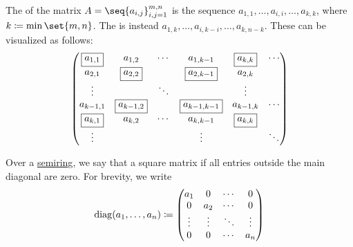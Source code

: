 \begin{definition}\label{def:matrix_diagonal}
  The  of the matrix \( A = \seq{ a_{i,j} }_{i,j=1}^{m,n} \) is the sequence \( a_{1,1}, \ldots, a_{i,i}, \ldots, a_{k,k} \), where \( k \coloneqq \min\set{ m, n } \). The  is instead \( a_{1,k}, \ldots, a_{i,k-i}, \ldots, a_{k,n-k} \). These can be visualized as follows:
  \begin{equation*}
    \begin{pmatrix}
      \fbox{\( a_{1,1} \)} & a_{1,2}                & \cdots & a_{1,k-1}                & \fbox{\( a_{k,k} \)} & \cdots \\
      a_{2,1}              & \fbox{\( a_{2,2} \)}   &        & \fbox{\( a_{2,k-1} \)}   & a_{2,k}              &        \\
      \vdots               &                        & \ddots &                          & \vdots               &        \\
      a_{k-1,1}            & \fbox{\( a_{k-1,2} \)} &        & \fbox{\( a_{k-1,k-1} \)} & a_{k-1,k}            & \cdots \\
      \fbox{\( a_{k,1} \)} & a_{k,2}                & \cdots & a_{k,k-1}                & \fbox{\( a_{k,k} \)} &        \\
      \vdots               &                        &        & \vdots                   &                      & \ddots
    \end{pmatrix}
  \end{equation*}

  Over a \hyperref[def:semiring]{semiring}, we say that a square matrix  if all entries outside the main diagonal are zero. For brevity, we write
  \begin{equation*}
    \operatorname{diag}(a_1, \ldots, a_n)
    \coloneqq
    \begin{pmatrix}
      a_1    & 0      & \cdots & 0      \\
      0      & a_2    & \cdots & 0      \\
      \vdots & \vdots & \ddots & \vdots \\
      0      & 0      & \cdots & a_n
    \end{pmatrix}
  \end{equation*}
\end{definition}

